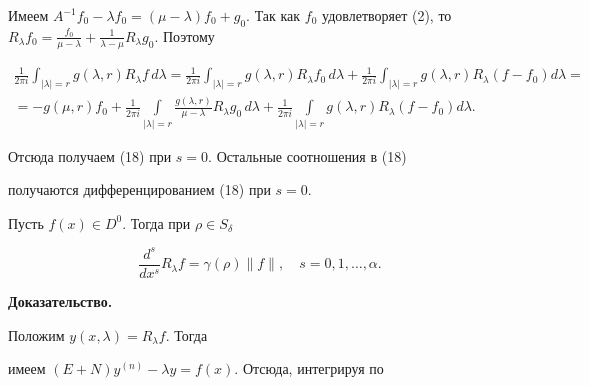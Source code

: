 \begin{pf}


Имеем $A^{-1}f_0-\lambda f_0=(\mu-\lambda)


f_0+g_0$. Так как $f_0$ удовлетворяет (2), то $R_


\lambda f_0= \frac {f_0}{\mu-\lambda}+ \frac 1{\lambda-\mu}


R_\lambda g_0$. Поэтому


\begin{multline*}


\frac 1{2\pi i}\int_{|\lambda|=r}g(\lambda,r)R_\lambda


f\,d\lambda= \frac 1{2\pi i}\int_{|\lambda|=r}g(\lambda,r)


R_\lambda f_0\,d\lambda+ \frac 1{2\pi i}\int_{|\lambda|=r}


g(\lambda,r)R_\lambda(f-f_0)d\lambda= \\


%


=-g(\mu,r)f_0+\frac 1{2\pi i}\int\limits_{|\lambda|=r}


\frac {g(\lambda,r)}{\mu-\lambda}R_\lambda g_0\,d\lambda+


\frac 1{2\pi i}\int\limits_{|\lambda|=r}g(\lambda,r)R_\lambda


(f-f_0)d\lambda.


\end{multline*}


Отсюда получаем (18) при $s=0$. Остальные соотношения в (18)


получаются дифференцированием (18) при $s=0$.


\end{pf}





\begin{thm}


Пусть $f(x)\in D^0$. Тогда при $\rho\in S_\delta$


$$


\frac {d^s}{dx^s}R_\lambda f=\gamma(\rho)\|f\|,\quad s=0,1,


\dotsc,\alpha.


$$


\end{thm}





{\bf Доказательство.}


Положим $y(x,\lambda)=R_\lambda f$. Тогда


имеем $(E+N)y^{(n)}-\lambda y=f(x)$. Отсюда, интегрируя по


